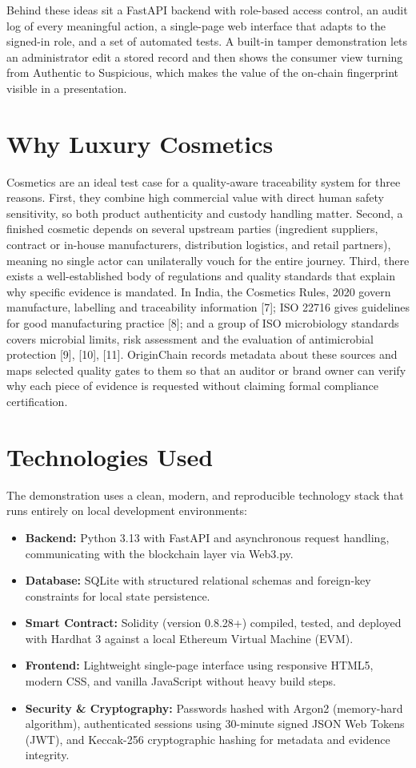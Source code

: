 \documentclass[12pt,a4paper]{report}
\begin{document}
Behind these ideas sit a FastAPI backend with role-based access control, an audit log of every meaningful action, a single-page web interface that adapts to the signed-in role, and a set of automated tests. A built-in tamper demonstration lets an administrator edit a stored record and then shows the consumer view turning from Authentic to Suspicious, which makes the value of the on-chain fingerprint visible in a presentation.

\section{Why Luxury Cosmetics}
Cosmetics are an ideal test case for a quality-aware traceability system for three reasons. First, they combine high commercial value with direct human safety sensitivity, so both product authenticity and custody handling matter. Second, a finished cosmetic depends on several upstream parties (ingredient suppliers, contract or in-house manufacturers, distribution logistics, and retail partners), meaning no single actor can unilaterally vouch for the entire journey. Third, there exists a well-established body of regulations and quality standards that explain why specific evidence is mandated. In India, the Cosmetics Rules, 2020 govern manufacture, labelling and traceability information [7]; ISO 22716 gives guidelines for good manufacturing practice [8]; and a group of ISO microbiology standards covers microbial limits, risk assessment and the evaluation of antimicrobial protection [9], [10], [11]. OriginChain records metadata about these sources and maps selected quality gates to them so that an auditor or brand owner can verify why each piece of evidence is requested without claiming formal compliance certification.

\section{Technologies Used}
The demonstration uses a clean, modern, and reproducible technology stack that runs entirely on local development environments:
\begin{itemize}[leftmargin=1.5em]
    \item \textbf{Backend:} Python 3.13 with FastAPI and asynchronous request handling, communicating with the blockchain layer via Web3.py.
    \item \textbf{Database:} SQLite with structured relational schemas and foreign-key constraints for local state persistence.
    \item \textbf{Smart Contract:} Solidity (version 0.8.28+) compiled, tested, and deployed with Hardhat 3 against a local Ethereum Virtual Machine (EVM).
    \item \textbf{Frontend:} Lightweight single-page interface using responsive HTML5, modern CSS, and vanilla JavaScript without heavy build steps.
    \item \textbf{Security \& Cryptography:} Passwords hashed with Argon2 (memory-hard algorithm), authenticated sessions using 30-minute signed JSON Web Tokens (JWT), and Keccak-256 cryptographic hashing for metadata and evidence integrity.
\end{itemize}
\end{document}

